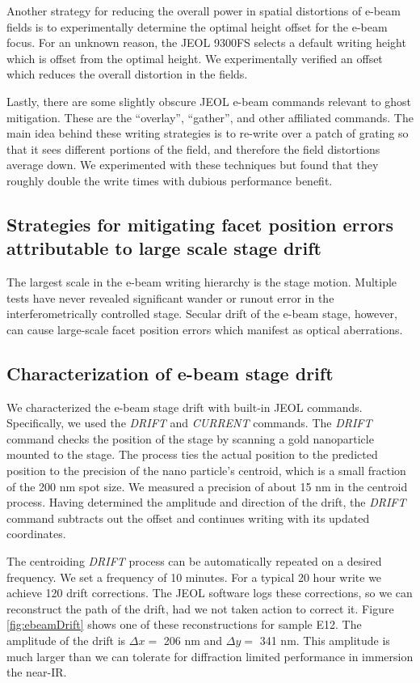 \documentclass[]{spie}  %
\begin{document}
Another strategy for reducing the overall power in spatial distortions of e-beam fields is to experimentally determine the optimal height offset for the e-beam focus.  For an unknown reason, the JEOL 9300FS selects a default writing height which is offset from the optimal height.  We experimentally verified an offset which reduces the overall distortion in the fields.

Lastly, there are some slightly obscure JEOL e-beam commands relevant to ghost mitigation.  These are the ``overlay'', ``gather'', and other affiliated commands.  The main idea behind these writing strategies is to re-write over a patch of grating so that it sees different portions of the field, and therefore the field distortions average down.  We experimented with these techniques but found that they roughly double the write times with dubious performance benefit.  


\subsection{Strategies for mitigating facet position errors attributable to large scale stage drift}

The largest scale in the e-beam writing hierarchy is the stage motion.  Multiple tests have never revealed significant wander or runout error in the interferometrically controlled stage.  Secular drift of the e-beam stage, however, can cause large-scale facet position errors which manifest as optical aberrations.

\subsection{Characterization of e-beam stage drift}
We characterized the e-beam stage drift with built-in JEOL commands.  Specifically, we used the \emph{DRIFT} and \emph{CURRENT} commands.  The \emph{DRIFT} command checks the position of the stage by scanning a gold nanoparticle mounted to the stage.  The process ties the actual position to the predicted position to the precision of the nano particle's centroid, which is a small fraction of the 200 nm spot size.  We measured a precision of about 15 nm in the centroid process.  Having determined the amplitude and direction of the drift, the \emph{DRIFT} command subtracts out the offset and continues writing with its updated coordinates.

The centroiding \emph{DRIFT} process can be automatically repeated on a desired frequency.  We set a frequency of 10 minutes.  For a typical 20 hour write we achieve 120 drift corrections.  The JEOL software logs these corrections, so we can reconstruct the path of the drift, had we not taken action to correct it.  Figure \ref{fig:ebeamDrift} shows one of these reconstructions for sample E12.  The amplitude of the drift is  $\Delta x = $ 206 nm and $\Delta y = $ 341 nm.  This amplitude is much larger than we can tolerate for diffraction limited performance in immersion the near-IR.  
\end{document}
